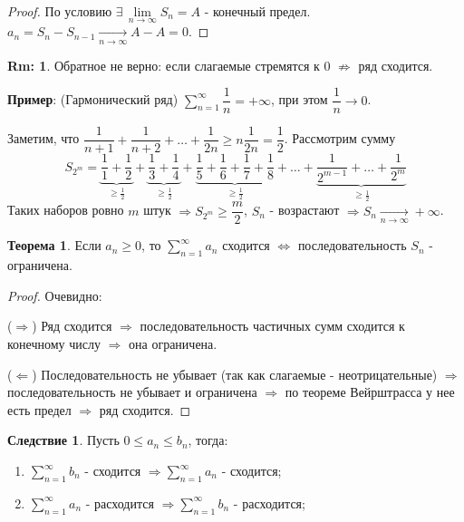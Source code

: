 \documentclass[12pt]{article}
\theoremstyle{definition}
\newtheorem{rem}{Rm:}
\newtheorem{theorem}{Теорема}
\newtheorem{corollary}{Следствие}
\begin{document}
\begin{proof}
	По условию $\exists \, \lim\limits_{n \to \infty} S_n = A$ - конечный предел. $a_n = S_n - S_{n-1} \xrightarrow[n \to \infty]{} A - A = 0$.
\end{proof}

\begin{rem}
	Обратное не верно: если слагаемые стремятся к 0 $\nRightarrow$ ряд сходится.
\end{rem}

\textbf{Пример}: (Гармонический ряд) $\displaystyle\sum\limits_{n=1}^{\infty} \dfrac{1}{n} = +\infty$, при этом $\dfrac{1}{n} \to 0$.

Заметим, что $\dfrac{1}{n+1} + \dfrac{1}{n+2} + \dotsc + \dfrac{1}{2n} \geq n\dfrac{1}{2n} = \dfrac{1}{2}$. Рассмотрим сумму $$S_{2^m} = \underbrace{\dfrac{1}{1} +\dfrac{1}{2}}_{\geq \frac{1}{2}} + \underbrace{\dfrac{1}{3} + \dfrac{1}{4}}_{\geq \frac{1}{2}}  + \underbrace{\dfrac{1}{5} +\dfrac{1}{6} + \dfrac{1}{7} + \dfrac{1}{8}}_{\geq \frac{1}{2}} + \dotsc + \underbrace{\dfrac{1}{2^{m-1}} + \dotsc + \dfrac{1}{2^{m}}}_{\geq \frac{1}{2}}$$
Таких наборов ровно $m$ штук $\Rightarrow S_{2^m} \geq \dfrac{m}{2}$, $S_n$ - возрастают $\Rightarrow S_n \xrightarrow[n \to \infty]{} +\infty$.

\begin{theorem}
	Если $a_n \geq 0$, то $\displaystyle\sum\limits_{n=1}^{\infty} a_n$ сходится $\Leftrightarrow$ последовательность $S_n$ - ограничена.
\end{theorem}
\begin{proof}
	Очевидно:
	 
	($\Rightarrow$) Ряд сходится $\Rightarrow$ последовательность частичных сумм сходится к конечному числу $\Rightarrow$ она ограничена.
	
	($\Leftarrow$) Последовательность не убывает (так как слагаемые - неотрицательные) $\Rightarrow$ последовательность не убывает и ограничена $\Rightarrow$ по теореме Вейрштрасса у нее есть предел $\Rightarrow$ ряд сходится.
\end{proof}

\begin{corollary}
	Пусть $0 \leq a_n \leq b_n$, тогда:
	\begin{enumerate}[label={\arabic*)}]
		\item $\displaystyle \sum\limits_{n=1}^{\infty} b_n$ - сходится $\Rightarrow \displaystyle \sum\limits_{n=1}^{\infty} a_n$ - сходится;
		\item $\displaystyle \sum\limits_{n=1}^{\infty} a_n$ - расходится $\Rightarrow \displaystyle \sum\limits_{n=1}^{\infty} b_n$ - расходится;
	\end{enumerate}
\end{corollary}
\end{document}
